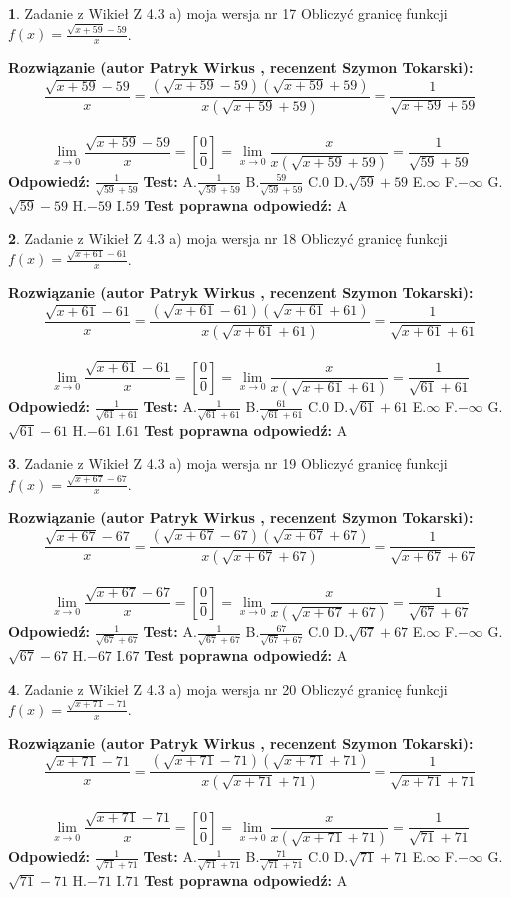 \documentclass[12pt, a4paper]{article}
\theoremstyle{definition} %
\newtheorem{zad}{}
\newcommand{\zadStart}[1]{\begin{zad}#1\newline}
\newcommand{\zadStop}{\end{zad}}
\newcommand{\rozwStart}[2]{\noindent \textbf{Rozwiązanie (autor #1 , recenzent #2): }\newline}
\newcommand{\rozwStop}{\newline}
\newcommand{\odpStart}{\noindent \textbf{Odpowiedź:}\newline}
\newcommand{\odpStop}{\newline}
\newcommand{\testStart}{\noindent \textbf{Test:}\newline}
\newcommand{\testStop}{\newline}
\newcommand{\kluczStart}{\noindent \textbf{Test poprawna odpowiedź:}\newline}
\newcommand{\kluczStop}{\newline}
\begin{document}
\zadStart{Zadanie z Wikieł Z 4.3 a) moja wersja nr 17}
Obliczyć granicę funkcji $f(x)=\frac{\sqrt{x+59}-59}{x}$.
\zadStop
\rozwStart{Patryk Wirkus}{Szymon Tokarski}
$$\frac{\sqrt{x+59}-59}{x}=\frac{(\sqrt{x+59}-59)(\sqrt{x+59}+59)}{x(\sqrt{x+59}+59)}=\frac{1}{\sqrt{x+59}+59}$$
\\
$$\lim\limits_{x\to0}\frac{\sqrt{x+59}-59}{x}=[\frac{0}{0}]=
\lim\limits_{x\to0}\frac{x}{x(\sqrt{x+59}+59)} = \frac{1}{\sqrt{59}+59}$$
\rozwStop
\odpStart
$\frac{1}{\sqrt{59}+59}$
\odpStop
\testStart
A.$\frac{1}{\sqrt{59}+59}$
B.$\frac{59}{\sqrt{59}+59}$
C.$0$
D.$\sqrt{59}+59$
E.$\infty$
F.$-\infty$
G.$\sqrt{59}-59$
H.$-59$
I.$59$
\testStop
\kluczStart
A
\kluczStop



\zadStart{Zadanie z Wikieł Z 4.3 a) moja wersja nr 18}
Obliczyć granicę funkcji $f(x)=\frac{\sqrt{x+61}-61}{x}$.
\zadStop
\rozwStart{Patryk Wirkus}{Szymon Tokarski}
$$\frac{\sqrt{x+61}-61}{x}=\frac{(\sqrt{x+61}-61)(\sqrt{x+61}+61)}{x(\sqrt{x+61}+61)}=\frac{1}{\sqrt{x+61}+61}$$
\\
$$\lim\limits_{x\to0}\frac{\sqrt{x+61}-61}{x}=[\frac{0}{0}]=
\lim\limits_{x\to0}\frac{x}{x(\sqrt{x+61}+61)} = \frac{1}{\sqrt{61}+61}$$
\rozwStop
\odpStart
$\frac{1}{\sqrt{61}+61}$
\odpStop
\testStart
A.$\frac{1}{\sqrt{61}+61}$
B.$\frac{61}{\sqrt{61}+61}$
C.$0$
D.$\sqrt{61}+61$
E.$\infty$
F.$-\infty$
G.$\sqrt{61}-61$
H.$-61$
I.$61$
\testStop
\kluczStart
A
\kluczStop



\zadStart{Zadanie z Wikieł Z 4.3 a) moja wersja nr 19}
Obliczyć granicę funkcji $f(x)=\frac{\sqrt{x+67}-67}{x}$.
\zadStop
\rozwStart{Patryk Wirkus}{Szymon Tokarski}
$$\frac{\sqrt{x+67}-67}{x}=\frac{(\sqrt{x+67}-67)(\sqrt{x+67}+67)}{x(\sqrt{x+67}+67)}=\frac{1}{\sqrt{x+67}+67}$$
\\
$$\lim\limits_{x\to0}\frac{\sqrt{x+67}-67}{x}=[\frac{0}{0}]=
\lim\limits_{x\to0}\frac{x}{x(\sqrt{x+67}+67)} = \frac{1}{\sqrt{67}+67}$$
\rozwStop
\odpStart
$\frac{1}{\sqrt{67}+67}$
\odpStop
\testStart
A.$\frac{1}{\sqrt{67}+67}$
B.$\frac{67}{\sqrt{67}+67}$
C.$0$
D.$\sqrt{67}+67$
E.$\infty$
F.$-\infty$
G.$\sqrt{67}-67$
H.$-67$
I.$67$
\testStop
\kluczStart
A
\kluczStop



\zadStart{Zadanie z Wikieł Z 4.3 a) moja wersja nr 20}
Obliczyć granicę funkcji $f(x)=\frac{\sqrt{x+71}-71}{x}$.
\zadStop
\rozwStart{Patryk Wirkus}{Szymon Tokarski}
$$\frac{\sqrt{x+71}-71}{x}=\frac{(\sqrt{x+71}-71)(\sqrt{x+71}+71)}{x(\sqrt{x+71}+71)}=\frac{1}{\sqrt{x+71}+71}$$
\\
$$\lim\limits_{x\to0}\frac{\sqrt{x+71}-71}{x}=[\frac{0}{0}]=
\lim\limits_{x\to0}\frac{x}{x(\sqrt{x+71}+71)} = \frac{1}{\sqrt{71}+71}$$
\rozwStop
\odpStart
$\frac{1}{\sqrt{71}+71}$
\odpStop
\testStart
A.$\frac{1}{\sqrt{71}+71}$
B.$\frac{71}{\sqrt{71}+71}$
C.$0$
D.$\sqrt{71}+71$
E.$\infty$
F.$-\infty$
G.$\sqrt{71}-71$
H.$-71$
I.$71$
\testStop
\kluczStart
A
\kluczStop
\end{document}
